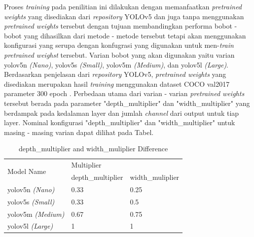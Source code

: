 \par Proses \emph{training} pada penilitian ini dilakukan dengan memanfaatkan \emph{pretrained weights} yang disediakan dari \emph{repository} YOLOv5 dan juga tanpa menggunakan \emph{pretrained weights} tersebut dengan tujuan membandingkan performa bobot - bobot yang dihasilkan dari metode - metode tersebut tetapi akan menggunakan konfigurasi yang serupa dengan konfugrasi yang digunakan untuk men-\emph{train} \emph{pretrained weighst} tersebut. Varian bobot yang akan digunakan yaitu varian yolov5n \emph{(Nano)}, yolov5s \emph{(Small)}, yolov5m \emph{(Medium)}, dan yolov5l \emph{(Large)}. Berdasarkan penjelasan dari \emph{repository} YOLOv5, \emph{pretrained weights} yang disediakan merupakan hasil \emph{training} menggunakan dataset COCO val2017 parameter 300 epoch \cite{glenn_jocher_yolov5}.  Perbedaan utama dari varian - varian \emph{pretrained weights} tersebut berada pada parameter "depth\_multiplier" dan "width\_multiplier" yang berdampak pada kedalaman layer dan jumlah \emph{channel} dari output untuk tiap layer. Nominal konfigurasi "depth\_multiplier" dan "width\_multiplier" untuk masing - masing varian dapat dilihat pada Tabel.

\begin{table} [ht]
  \caption{depth\_multiplier and width\_muliplier Difference}
  \label{tb:pretrainedparamdiff}
  \centering
  \begin{tabular}{|l|l|l|}
    \hline
    \multirow{2}{*}{Model Name} & \multicolumn{2}{l|}{Multiplier}      \\ 
    \cline{2-3}
                                 & depth\_multiplier & width\_muliplier  \\ 
    \hline
    yolov5n\textit{ (Nano)}      & 0.33              & 0.25              \\
    yolov5s\textit{ (Small)}     & 0.33              & 0.5               \\
    yolov5m\textit{ (Medium)}    & 0.67              & 0.75              \\
    yolov5l\textit{ (Large)}     & 1                 & 1                 \\
    \hline
  \end{tabular}
\end{table}


